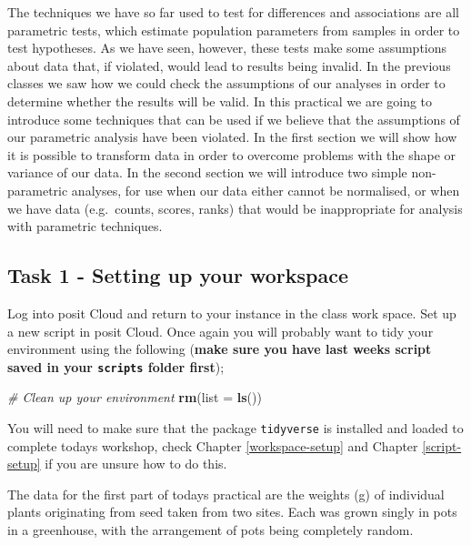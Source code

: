 \documentclass[
]{book}
\newenvironment{Shaded}{\begin{snugshade}}{\end{snugshade}}
\newcommand{\AttributeTok}[1]{\textcolor[rgb]{0.13,0.29,0.53}{#1}}
\newcommand{\CommentTok}[1]{\textcolor[rgb]{0.56,0.35,0.01}{\textit{#1}}}
\newcommand{\FunctionTok}[1]{\textcolor[rgb]{0.13,0.29,0.53}{\textbf{#1}}}
\newcommand{\NormalTok}[1]{#1}
\begin{document}
The techniques we have so far used to test for differences and associations are all parametric tests, which estimate population parameters from samples in order to test hypotheses. As we have seen, however, these tests make some assumptions about data that, if violated, would lead to results being invalid. In the previous classes we saw how we could check the assumptions of our analyses in order to determine whether the results will be valid. In this practical we are going to introduce some techniques that can be used if we believe that the assumptions of our parametric analysis have been violated. In the first section we will show how it is possible to transform data in order to overcome problems with the shape or variance of our data. In the second section we will introduce two simple non-parametric analyses, for use when our data either cannot be normalised, or when we have data (e.g.~counts, scores, ranks) that would be inappropriate for analysis with parametric techniques.

\hypertarget{task-1---setting-up-your-workspace-2}{%
\subsection{Task 1 - Setting up your workspace}\label{task-1---setting-up-your-workspace-2}}

Log into posit Cloud and return to your instance in the class work space. Set up a new script in posit Cloud. Once again you will probably want to tidy your environment using the following (\textbf{make sure you have last weeks script saved in your \texttt{scripts} folder first});

\begin{Shaded}
\begin{Highlighting}[]
\CommentTok{\# Clean up your environment}
\FunctionTok{rm}\NormalTok{(}\AttributeTok{list =} \FunctionTok{ls}\NormalTok{())}
\end{Highlighting}
\end{Shaded}

You will need to make sure that the package \texttt{tidyverse} is installed and loaded to complete todays workshop, check Chapter \ref{workspace-setup} and Chapter \ref{script-setup} if you are unsure how to do this.

The data for the first part of todays practical are the weights (g) of individual plants originating from seed taken from two sites. Each was grown singly in pots in a greenhouse, with the arrangement of pots being completely random.
\end{document}
